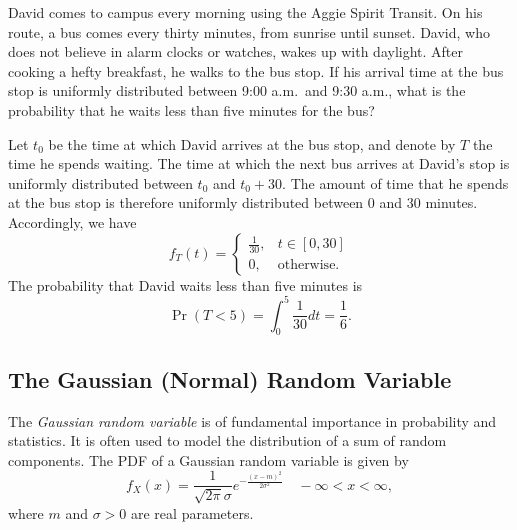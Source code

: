 \begin{example}
David comes to campus every morning using the Aggie Spirit Transit.
On his route, a bus comes every thirty minutes, from sunrise until sunset.
David, who does not believe in alarm clocks or watches, wakes up with daylight.
After cooking a hefty breakfast, he walks to the bus stop.
If his arrival time at the bus stop is uniformly distributed between 9:00 a.m.\ and 9:30 a.m., what is the probability that he waits less than five minutes for the bus?

Let $t_0$ be the time at which David arrives at the bus stop, and denote by $T$ the time he spends waiting.
The time at which the next bus arrives at David's stop is uniformly distributed between $t_0$ and $t_0 + 30$.
The amount of time that he spends at the bus stop is therefore uniformly distributed between $0$ and $30$ minutes.
Accordingly, we have
\begin{equation*}
f_T(t) = \begin{cases} \frac{1}{30}, & t \in [0, 30] \\
0, & \text{otherwise}. \end{cases}
\end{equation*}
The probability that David waits less than five minutes is
\begin{equation*}
\Pr (T < 5) = \int_0^5 \frac{1}{30} dt = \frac{1}{6} .
\end{equation*}
\end{example}


\subsection{The Gaussian (Normal) Random Variable}

The \emph{Gaussian random variable} is of fundamental importance in probability and statistics. 
It is often used to model the distribution of a sum of random components.
The PDF of a Gaussian random variable is given by
\begin{equation*}
f_X (x) = \frac{1}{\sqrt{2 \pi} \sigma} e^{- \frac{(x - m)^2}{2 \sigma^2}}
\quad - \infty < x < \infty,
\end{equation*}
where $m$ and $\sigma > 0$ are real parameters.

